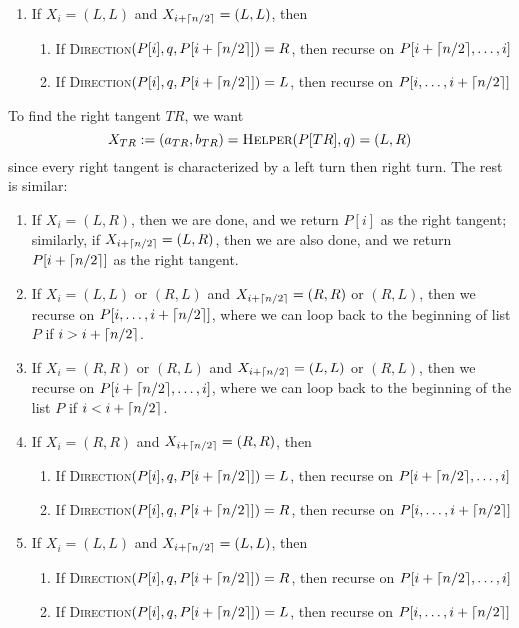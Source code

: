 \documentclass{article}
\DeclarePairedDelimiter\ceil{\lceil}{\rceil}
\begin{document}
\begin{enumerate}[(a)]
\begin{enumerate}
\item If $X_i=(L,L)$ and $X_{i+\ceil{n/2}}=(L,L)$, then 
	\begin{enumerate}
	\item If \textsc{Direction}$(P[i],q,P[i+\ceil{n/2}]) = R$, then recurse on $P[i+\ceil{n/2},\dots,i]$
	\item If \textsc{Direction}$(P[i],q,P[i+\ceil{n/2}]) = L$, then recurse on $P[i, \dots, i+\ceil{n/2}]$
	\end{enumerate}
\end{enumerate}

To find the right tangent $TR$, we want
$$X_{TR}:=(a_{TR},b_{TR})=\textsc{Helper}(P[TR],q) = (L,R)$$
since every right tangent is characterized by a left turn then right turn. The rest is similar:
\begin{enumerate}
\item If $X_i =(L,R)$, then we are done, and we return $P[i]$ as the right tangent; similarly, if $X_{i+\ceil{n/2}}=(L,R)$, then we are also done, and we return $P[i+\ceil{n/2}]$ as the right tangent.

\item If $X_i=(L,L)$ or $(R,L)$ and $X_{i+\ceil{n/2}}=(R,R)$ or $(R,L)$, then we recurse on $P[i, \dots, i+\ceil{n/2}]$, where we can loop back to the beginning of list $P$ if $i>i+\ceil{n/2}$.

\item If $X_i=(R,R)$ or $(R,L)$ and $X_{i+\ceil{n/2}}=(L,L)$ or $(R,L)$, then we recurse on $P[i+\ceil{n/2}, \dots, i]$, where we can loop back to the beginning of the list $P$ if $i<i+\ceil{n/2}$. 

\item If $X_i=(R,R)$ and $X_{i+\ceil{n/2}}=(R,R)$, then 
	\begin{enumerate}
	\item If \textsc{Direction}$(P[i],q,P[i+\ceil{n/2}]) = L$, then recurse on $P[i+\ceil{n/2},\dots,i]$
	\item If \textsc{Direction}$(P[i],q,P[i+\ceil{n/2}]) = R$, then recurse on $P[i, \dots, i+\ceil{n/2}]$
	\end{enumerate}

\item If $X_i=(L,L)$ and $X_{i+\ceil{n/2}}=(L,L)$, then 
	\begin{enumerate}
	\item If \textsc{Direction}$(P[i],q,P[i+\ceil{n/2}]) = R$, then recurse on $P[i+\ceil{n/2},\dots,i]$
	\item If \textsc{Direction}$(P[i],q,P[i+\ceil{n/2}]) = L$, then recurse on $P[i, \dots, i+\ceil{n/2}]$
	\end{enumerate}
\end{enumerate}


\end{enumerate}
\end{document}
